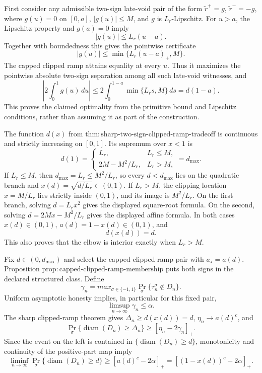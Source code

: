 First consider any admissible two-sign late-void pair of the form \(\widetilde r^+=g\), \(\widetilde r^-=-g\), where \(g(u)=0\) on \([0,a]\), \(|g(u)|\le M\), and \(g\) is \(L_r\)-Lipschitz. For \(u>a\), the Lipschitz property and \(g(a)=0\) imply
\[
 |g(u)|\le L_r(u-a).
\]
Together with boundedness this gives the pointwise certificate
\[
 |g(u)|\le\min\{L_r(u-a)_+,M\}.
\]
The capped clipped ramp attains equality at every \(u\). Thus it maximizes the pointwise absolute two-sign separation among all such late-void witnesses, and
\[
 \left|2\int_0^1g(u)\,du\right|
 \le2\int_0^{1-a}\min\{L_rs,M\}\,ds=d(1-a).
\]
This proves the claimed optimality from the primitive bound and Lipschitz conditions, rather than assuming it as part of the construction.

The function \(d(x)\) from \(\mathrm{thm:sharp\mbox{-}two\mbox{-}sign\mbox{-}clipped\mbox{-}ramp\mbox{-}tradeoff}\) is continuous and strictly increasing on \([0,1]\). Its supremum over \(x<1\) is
\[
 d(1)=
 \begin{cases}
 L_r,&L_r\le M,\\
 2M-M^2/L_r,&L_r>M,
 \end{cases}
 =d_{\max}.
\]
If \(L_r\le M\), then \(d_{\max}=L_r\le M^2/L_r\), so every \(d<d_{\max}\) lies on the quadratic branch and \(x(d)=\sqrt{d/L_r}\in(0,1)\). If \(L_r>M\), the clipping location \(x=M/L_r\) lies strictly inside \((0,1)\), and its image is \(M^2/L_r\). On the first branch, solving \(d=L_rx^2\) gives the displayed square-root formula. On the second, solving \(d=2Mx-M^2/L_r\) gives the displayed affine formula. In both cases \(x(d)\in(0,1)\), \(a(d)=1-x(d)\in(0,1)\), and
\[
 d(x(d))=d.
\]
This also proves that the elbow is interior exactly when \(L_r>M\).

Fix \(d\in(0,d_{\max})\) and select the capped clipped-ramp pair with \(a_\star=a(d)\). Proposition \(\mathrm{prop:capped\mbox{-}clipped\mbox{-}ramp\mbox{-}membership}\) puts both signs in the declared structured class. Define
\[
 \gamma_n=max_{\sigma\in\{-1,1\}}
 \Pr_\sigma\{\tau_n^\sigma\notin D_n\}.
\]
Uniform asymptotic honesty implies, in particular for this fixed pair,
\[
 \limsup_{n\to\infty}\gamma_n\le\alpha.
\]
The sharp clipped-ramp theorem gives \(\Delta_n\ge d(x(d))=d\), \(\eta_n\to a(d)^c\), and
\[
 \Pr_\sigma\{\operatorname{diam}(D_n)\ge\Delta_n\}
 \ge[\eta_n-2\gamma_n]_+.
\]
Since the event on the left is contained in \(\{\operatorname{diam}(D_n)\ge d\}\), monotonicity and continuity of the positive-part map imply
\[
 \liminf_{n\to\infty}
 \Pr_\sigma\{\operatorname{diam}(D_n)\ge d\}
 \ge[a(d)^c-2\alpha]_+
 =[(1-x(d))^c-2\alpha]_+.
\]

